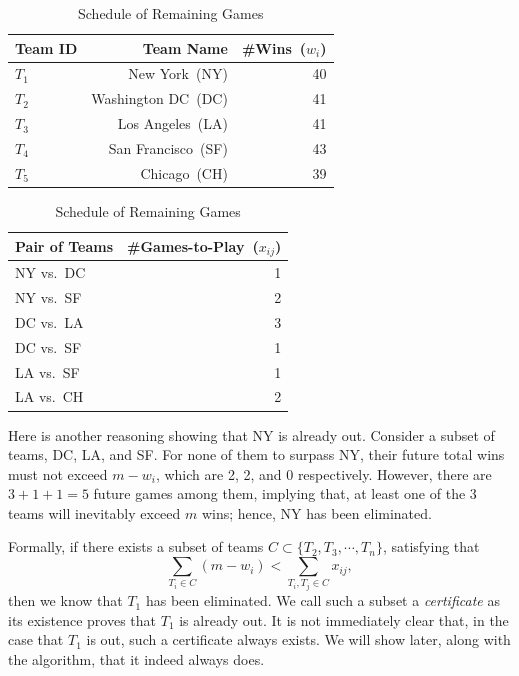 \begin{table}[ht]
\renewcommand{\arraystretch}{1.2}
\centering
\begin{minipage}{0.45\textwidth}
\centering
\caption{Standing Board}
\begin{tabular}{lrr}
\hline
Team ID & Team Name & \#Wins~($w_i$) \\
\hline
$T_1$ & New York~(NY) & 40 \\
$T_2$ & Washington DC~(DC) & 41 \\
$T_3$ & Los Angeles~(LA) & 41 \\
$T_4$ & San Francisco~(SF) & 43 \\
$T_5$ & Chicago~(CH) & 39 \\
\hline
\end{tabular}
\end{minipage}\hfill
\begin{minipage}{0.45\textwidth}
\centering
\caption{Schedule of Remaining Games}
\begin{tabular}{lr}
\hline
Pair of Teams & \#Games-to-Play~($x_{ij}$) \\
\hline
NY vs.\ DC & 1 \\
NY vs.\ SF & 2 \\
DC vs.\ LA & 3 \\
DC vs.\ SF & 1 \\
LA vs.\ SF & 1 \\
LA vs.\ CH & 2 \\
\hline
\end{tabular}
\end{minipage}
\end{table}

Here is another reasoning showing that NY is already out.
Consider a subset of teams, DC, LA, and SF.
For none of them to surpass NY, their future
total wins must not exceed $m-w_i$, which are 
2, 2, and 0 respectively. However, there are $3+1+1=5$ future
games among them, implying that, at least one of the 3 teams
will inevitably exceed $m$ wins; hence, NY has been eliminated.

Formally, if there exists a subset of teams $C\subset\{T_2, T_3, \cdots, T_n\}$, 
satisfying that $$\sum_{T_i\in C} (m-w_i) < \sum_{T_i, T_j\in C} x_{ij},$$
then we know that $T_1$ has been eliminated. 
We call such a subset a \emph{certificate}
as its existence proves that $T_1$ is already out.
It is not immediately clear that, in the case that $T_1$ is out, such a certificate always exists.
We will show later, along with the algorithm, that it indeed always does.

